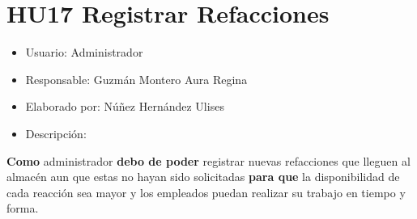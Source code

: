 \section{HU17 Registrar Refacciones}
\begin{itemize}
	\item Usuario: Administrador
	\item Responsable: Guzmán Montero Aura Regina
	\item Elaborado por: Núñez Hernández Ulises
	\item Descripción:\\
\end{itemize}

\textbf{Como} administrador \textbf{debo de poder} registrar nuevas refacciones que lleguen al almacén aun que estas no hayan sido solicitadas \textbf{para que} la disponibilidad de cada reacción sea mayor y los empleados puedan realizar su trabajo en tiempo y forma.